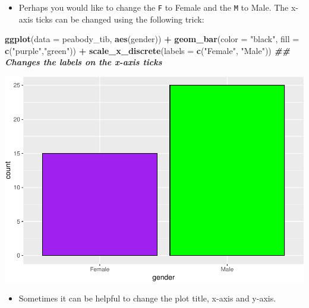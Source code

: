 \documentclass[
]{book}
\newenvironment{Shaded}{\begin{snugshade}}{\end{snugshade}}
\newcommand{\AttributeTok}[1]{\textcolor[rgb]{0.13,0.29,0.53}{#1}}
\newcommand{\DocumentationTok}[1]{\textcolor[rgb]{0.56,0.35,0.01}{\textbf{\textit{#1}}}}
\newcommand{\FunctionTok}[1]{\textcolor[rgb]{0.13,0.29,0.53}{\textbf{#1}}}
\newcommand{\NormalTok}[1]{#1}
\newcommand{\SpecialCharTok}[1]{\textcolor[rgb]{0.81,0.36,0.00}{\textbf{#1}}}
\newcommand{\StringTok}[1]{\textcolor[rgb]{0.31,0.60,0.02}{#1}}
\providecommand{\tightlist}{%
  \setlength{\itemsep}{0pt}\setlength{\parskip}{0pt}}
\begin{document}
\begin{itemize}
\tightlist
\item
  Perhaps you would like to change the \texttt{F} to Female and the \texttt{M} to Male. The x-axis ticks can be changed using the following trick:
\end{itemize}

\begin{Shaded}
\begin{Highlighting}[]
\FunctionTok{ggplot}\NormalTok{(}\AttributeTok{data =}\NormalTok{ peabody\_tib, }\FunctionTok{aes}\NormalTok{(gender)) }\SpecialCharTok{+}
  \FunctionTok{geom\_bar}\NormalTok{(}\AttributeTok{color =} \StringTok{"black"}\NormalTok{, }\AttributeTok{fill =} \FunctionTok{c}\NormalTok{(}\StringTok{"purple"}\NormalTok{,}\StringTok{"green"}\NormalTok{)) }\SpecialCharTok{+}
  \FunctionTok{scale\_x\_discrete}\NormalTok{(}\AttributeTok{labels =} \FunctionTok{c}\NormalTok{(}\StringTok{"Female"}\NormalTok{, }\StringTok{"Male"}\NormalTok{)) }\DocumentationTok{\#\# Changes the labels on the x{-}axis ticks}
\end{Highlighting}
\end{Shaded}

\includegraphics{PSY202A-Modeling-I.Heo_files/figure-latex/unnamed-chunk-80-1.pdf}

\begin{itemize}
\tightlist
\item
  Sometimes it can be helpful to change the plot title, x-axis and y-axis.
\end{itemize}
\end{document}
